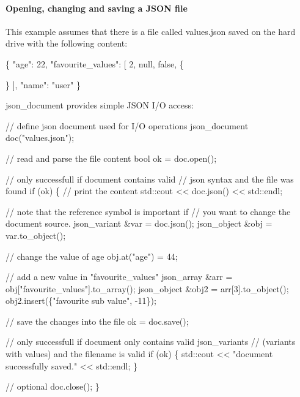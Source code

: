 \paragraph*{\label{_opening_changing_section}%
Opening, changing and saving a J\+S\+ON file}

This example assumes that there is a file called {\ttfamily values.\+json} saved on the hard drive with the following content\+: 
\begin{DoxyCode}
\{
    "age": 22,
    "favourite\_values": [
        2,
        null,
        false,
        \{

        \}
    ],
    "name": "user"
\}
\end{DoxyCode}
 {\ttfamily json\+\_\+document} provides simple J\+S\+ON I/O access\+: 
\begin{DoxyCode}
\textcolor{comment}{// define json document used for I/O operations}
json\_document doc(\textcolor{stringliteral}{"values.json"});

\textcolor{comment}{// read and parse the file content}
\textcolor{keywordtype}{bool} ok = doc.open();

\textcolor{comment}{// only successfull if document contains valid }
\textcolor{comment}{// json syntax and the file was found}
\textcolor{keywordflow}{if} (ok) \{
    \textcolor{comment}{// print the content}
    std::cout << doc.json() << std::endl;

    \textcolor{comment}{// note that the reference symbol is important if }
    \textcolor{comment}{// you want to change the document source.}
    json\_variant &var = doc.json();
    json\_object &obj = var.to\_object();

    \textcolor{comment}{// change the value of age}
    obj.at(\textcolor{stringliteral}{"age"}) = 44;

    \textcolor{comment}{// add a new value in "favourite\_values" }
    json\_array &arr = obj[\textcolor{stringliteral}{"favourite\_values"}].to\_array();
    json\_object &obj2 = arr[3].to\_object();
    obj2.insert(\{\textcolor{stringliteral}{"favourite sub value"}, -11\});

    \textcolor{comment}{// save the changes into the file}
    ok = doc.save();

    \textcolor{comment}{// only successfull if document only contains valid json\_variants}
    \textcolor{comment}{// (variants with values) and the filename is valid}
    \textcolor{keywordflow}{if} (ok) \{ 
        std::cout << \textcolor{stringliteral}{"document successfully saved."} << std::endl;
    \}

    \textcolor{comment}{// optional}
    doc.close(); 
\}
\end{DoxyCode}


